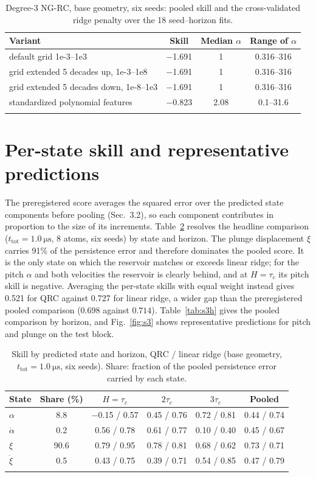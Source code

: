 \documentclass[pdflatex,sn-mathphys-num]{sn-jnl}
\begin{document}
\begin{table}[htb]
\caption{Degree-3 NG-RC, base geometry, six seeds: pooled skill and the cross-validated ridge penalty over the 18 seed--horizon fits.}\label{tab:s2}
\begin{tabular}{@{}lccc@{}}
\toprule
Variant & Skill & Median $\alpha$ & Range of $\alpha$ \\
\midrule
default grid 1e-3--1e3 & $-$1.691 & 1 & 0.316--316 \\
grid extended 5 decades up, 1e-3--1e8 & $-$1.691 & 1 & 0.316--316 \\
grid extended 5 decades down, 1e-8--1e3 & $-$1.691 & 1 & 0.316--316 \\
standardized polynomial features & $-$0.823 & 2.08 & 0.1--31.6 \\
\botrule
\end{tabular}
\end{table}

\section{Per-state skill and representative predictions}\label{sec:s3}

The preregistered score averages the squared error over the predicted state components before pooling (Sec.~3.2), so each component contributes in proportion to the size of its increments. Table~\ref{tab:s3} resolves the headline comparison ($t_{\mathrm{tot}}=\SI{1.0}{\micro\second}$, 8 atoms, six seeds) by state and horizon. The plunge displacement $\xi$ carries 91\% of the persistence error and therefore dominates the pooled score. It is the only state on which the reservoir matches or exceeds linear ridge; for the pitch $\alpha$ and both velocities the reservoir is clearly behind, and at $H=\tau_c$ its pitch skill is negative. Averaging the per-state skills with equal weight instead gives 0.521 for QRC against 0.727 for linear ridge, a wider gap than the preregistered pooled comparison ($0.698$ against $0.714$). Table~\ref{tab:s3h} gives the pooled comparison by horizon, and Fig.~\ref{fig:s3} shows representative predictions for pitch and plunge on the test block.

\begin{table}[htb]
\caption{Skill by predicted state and horizon, QRC / linear ridge (base geometry, $t_{\mathrm{tot}}=\SI{1.0}{\micro\second}$, six seeds). Share: fraction of the pooled persistence error carried by each state.}\label{tab:s3}
\begin{tabular}{@{}lccccc@{}}
\toprule
State & Share (\%) & $H=\tau_c$ & $2\tau_c$ & $3\tau_c$ & Pooled \\
\midrule
$\alpha$ & 8.8 & $-$0.15 / 0.57 & 0.45 / 0.76 & 0.72 / 0.81 & 0.44 / 0.74 \\
$\dot\alpha$ & 0.2 & 0.56 / 0.78 & 0.61 / 0.77 & 0.10 / 0.40 & 0.45 / 0.67 \\
$\xi$ & 90.6 & 0.79 / 0.95 & 0.78 / 0.81 & 0.68 / 0.62 & 0.73 / 0.71 \\
$\dot\xi$ & 0.5 & 0.43 / 0.75 & 0.39 / 0.71 & 0.54 / 0.85 & 0.47 / 0.79 \\
\botrule
\end{tabular}
\end{table}
\end{document}
